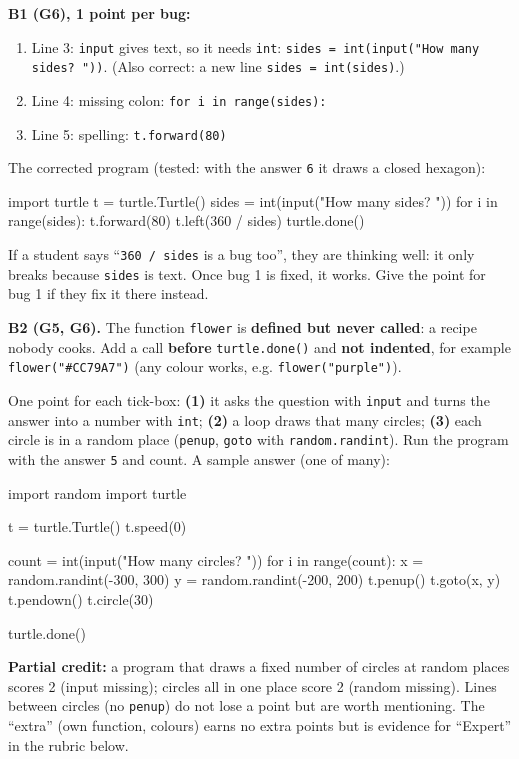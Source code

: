 \begin{answer}
\textbf{B1 (G6), 1 point per bug:}
\begin{enumerate}[itemsep=1pt]
  \item Line 3: \texttt{input} gives text, so it needs \texttt{int}: \texttt{sides = int(input("How many sides? "))}.
        (Also correct: a new line \texttt{sides = int(sides)}.)
  \item Line 4: missing colon: \texttt{for i in range(sides):}
  \item Line 5: spelling: \texttt{t.forward(80)}
\end{enumerate}
The corrected program (tested: with the answer \texttt{6} it draws a closed hexagon):
\begin{pycode}
import turtle
t = turtle.Turtle()
sides = int(input("How many sides? "))
for i in range(sides):
    t.forward(80)
    t.left(360 / sides)
turtle.done()
\end{pycode}
If a student says \enquote{\texttt{360 / sides} is a bug too}, they are thinking well: it only breaks because
\texttt{sides} is text. Once bug 1 is fixed, it works. Give the point for bug 1 if they fix it there instead.

\textbf{B2 (G5, G6).} The function \texttt{flower} is \textbf{defined but never called}: a recipe nobody cooks.
Add a call \textbf{before} \texttt{turtle.done()} and \textbf{not indented}, for example
\texttt{flower("\#CC79A7")} (any colour works, e.g. \texttt{flower("purple")}).
\end{answer}

\begin{answer}
One point for each tick-box: \textbf{(1)} it asks the question with \texttt{input} and turns the answer into a number with
\texttt{int}; \textbf{(2)} a loop draws that many circles; \textbf{(3)} each circle is in a random place
(\texttt{penup}, \texttt{goto} with \texttt{random.randint}). Run the program with the answer \texttt{5} and count.
A sample answer (one of many):
\begin{pycode}
import random
import turtle

t = turtle.Turtle()
t.speed(0)

count = int(input("How many circles? "))
for i in range(count):
    x = random.randint(-300, 300)
    y = random.randint(-200, 200)
    t.penup()
    t.goto(x, y)
    t.pendown()
    t.circle(30)

turtle.done()
\end{pycode}
\textbf{Partial credit:} a program that draws a fixed number of circles at random places scores 2 (input missing);
circles all in one place score 2 (random missing). Lines between circles (no \texttt{penup}) do not lose a point but
are worth mentioning. The \enquote{extra} (own function, colours) earns no extra points but is evidence for
\enquote{Expert} in the rubric below.
\end{answer}

